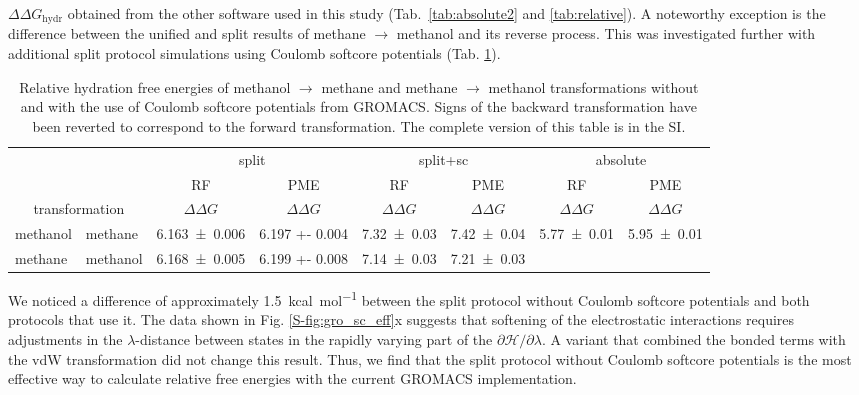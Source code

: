 \documentclass[journal=jctcce,manuscript=article]{achemso}
\begin{document}
$\Delta \Delta G_{\mathrm{hydr}}$ obtained from the other software used in this
study (Tab.~\ref{tab:absolute2} and \ref{tab:relative}).  A noteworthy
exception is the difference between the unified and split results of methane
$\rightarrow$ methanol and its reverse process. This was investigated further with
additional split protocol simulations using Coulomb softcore potentials (Tab.
\ref{tab:eff-sc}).

\begin{table}[]
\centering
\caption{Relative hydration free energies of methanol $\rightarrow$ methane and
methane $\rightarrow$ methanol transformations without and with the use of
Coulomb softcore potentials from GROMACS. Signs of the backward
transformation have been reverted to correspond to the forward transformation.
The complete version of this table is in the SI.}
\label{tab:eff-sc}
\begin{tabular}{@{}llclclcl@{}}
\toprule
 &  & \multicolumn{2}{c}{split} & \multicolumn{2}{c}{split+sc} &
 \multicolumn{2}{c}{absolute} \\
 &  & RF & \multicolumn{1}{c}{PME} & RF & \multicolumn{1}{c}{PME} & RF &
 \multicolumn{1}{c}{PME} \\
\multicolumn{2}{c}{transformation} & $\Delta \Delta G$ &
\multicolumn{1}{c}{$\Delta \Delta G$} & $\Delta \Delta G$ &
\multicolumn{1}{c}{$\Delta \Delta G$} & $\Delta \Delta G$ &
\multicolumn{1}{c}{$\Delta \Delta G$} \\ \midrule
methanol & methane & \multicolumn{1}{l}{\num{6.163 +- 0.006}} & \num{6.197 +-
0.004} & \multicolumn{1}{l}{\num{7.32+-0.03}} & \num{7.42+-0.04} &
\multicolumn{1}{l}{\num{5.77 +- 0.01}} & \num{5.95 +- 0.01} \\
methane & methanol & \multicolumn{1}{l}{\num{6.168 +- 0.005}} & \num{6.199 +-
0.008} & \multicolumn{1}{l}{\num{7.14+-0.03}} & \num{7.21+-0.03} &
\multicolumn{1}{l}{} &  \\ \bottomrule
\end{tabular}
\end{table}

We noticed a difference of approximately \SI{1.5}{kcal.mol^{-1}} between the
split protocol without Coulomb softcore potentials and both protocols that
use it.  The data shown in Fig. \ref{S-fig:gro_sc_eff}x suggests that
softening of the electrostatic interactions requires adjustments in
the $\lambda$-distance between states in the rapidly varying part of
the $\partial \mathcal{H}/\partial\lambda$.  A variant that combined
the bonded terms with the vdW transformation did not change this
result.  Thus, we find that the split protocol without Coulomb
softcore potentials is the most effective way to calculate relative
free energies with the current GROMACS implementation.
\end{document}
